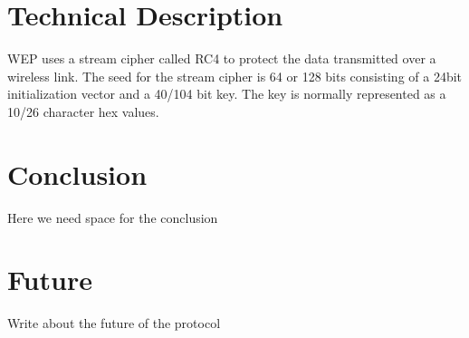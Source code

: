\documentclass[twocolumn]{IEEEtran}
\begin{document}
\section {Technical Description}
\label{sec:technical_description}

WEP uses a stream cipher called RC4 to protect the data transmitted over a wireless link. The seed for the stream cipher is 64 or 128 bits consisting of a 24bit initialization vector and a 40/104 bit key. The key is normally represented as a 10/26 character hex values.




\section {Conclusion}
\label{sec:conclusion}

Here we need space for the conclusion



\section {Future}
\label{sec:future}

Write about the future of the protocol






\end{document}
